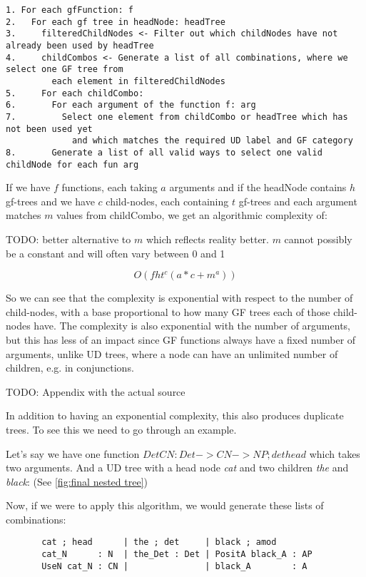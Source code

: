 

\begin{verbatim}
1. For each gfFunction: f
2.   For each gf tree in headNode: headTree
3.     filteredChildNodes <- Filter out which childNodes have not already been used by headTree
4.     childCombos <- Generate a list of all combinations, where we select one GF tree from
         each element in filteredChildNodes
5.     For each childCombo:
6.       For each argument of the function f: arg
7.         Select one element from childCombo or headTree which has not been used yet
             and which matches the required UD label and GF category
8.       Generate a list of all valid ways to select one valid childNode for each fun arg
\end{verbatim}

If we have $f$ functions, each taking $a$ arguments and
if the headNode contains $h$ gf-trees
and we have $c$ child-nodes, each containing $t$ gf-trees
and each argument matches $m$ values from childCombo, we get an algorithmic complexity of:

TODO: better alternative to $m$ which reflects reality better. $m$ cannot possibly be a constant and will often vary between 0 and 1

$$
O(f h t^c (a*c+m^a))
$$

So we can see that the complexity is exponential with respect to the number of child-nodes, with a base proportional to how many GF trees each of those child-nodes have. The complexity is also exponential with the number of arguments, but this has less of an impact since GF functions always have a fixed number of arguments, unlike UD trees, where a node can have an unlimited number of children, e.g. in conjunctions.

TODO: Appendix with the actual source

In addition to having an exponential complexity, this also produces duplicate trees. To see this we need to go through an example.

Let's say we have one function $DetCN : Det -> CN -> NP ; det head$ which takes two arguments.
And a UD tree with a head node \emph{cat} and two children \emph{the} and \emph{black}: (See \autoref{fig:final nested tree})

Now, if we were to apply this algorithm, we would generate these lists of combinations:
\begin{verbatim}
       cat ; head      | the ; det     | black ; amod
       cat_N      : N  | the_Det : Det | PositA black_A : AP
       UseN cat_N : CN |               | black_A        : A
\end{verbatim}

